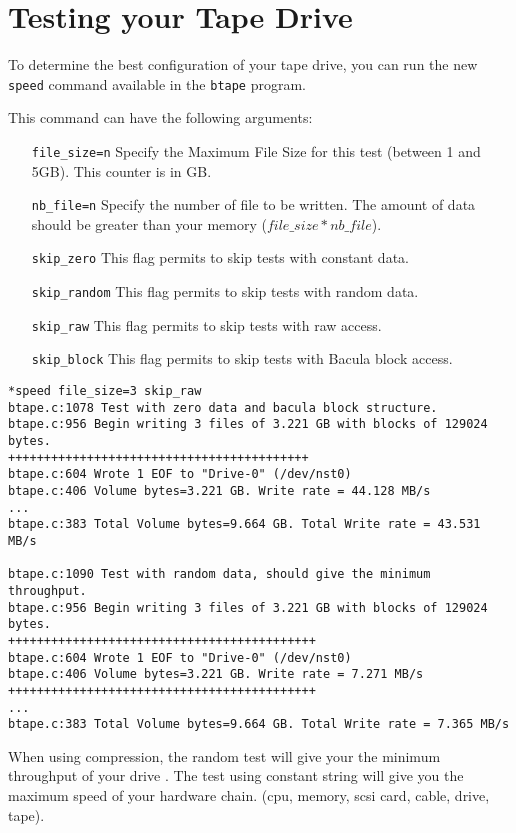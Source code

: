 \section{Testing your Tape Drive}
\label{sec:btapespeed}

To determine the best configuration of your tape drive, you can run the new
\texttt{speed} command available in the \texttt{btape} program.

This command can have the following arguments:
\begin{itemize}
\item[\texttt{file\_size=n}] Specify the Maximum File Size for this test
  (between 1 and 5GB). This counter is in GB.
\item[\texttt{nb\_file=n}] Specify the number of file to be written. The amount
  of data should be greater than your memory ($file\_size*nb\_file$).
\item[\texttt{skip\_zero}] This flag permits to skip tests with constant
  data.
\item[\texttt{skip\_random}] This flag permits to skip tests with random
  data.
\item[\texttt{skip\_raw}] This flag permits to skip tests with raw access.
\item[\texttt{skip\_block}] This flag permits to skip tests with Bacula block
  access.
\end{itemize}

\begin{verbatim}
*speed file_size=3 skip_raw
btape.c:1078 Test with zero data and bacula block structure.
btape.c:956 Begin writing 3 files of 3.221 GB with blocks of 129024 bytes.
++++++++++++++++++++++++++++++++++++++++++
btape.c:604 Wrote 1 EOF to "Drive-0" (/dev/nst0)
btape.c:406 Volume bytes=3.221 GB. Write rate = 44.128 MB/s
...
btape.c:383 Total Volume bytes=9.664 GB. Total Write rate = 43.531 MB/s

btape.c:1090 Test with random data, should give the minimum throughput.
btape.c:956 Begin writing 3 files of 3.221 GB with blocks of 129024 bytes.
+++++++++++++++++++++++++++++++++++++++++++
btape.c:604 Wrote 1 EOF to "Drive-0" (/dev/nst0)
btape.c:406 Volume bytes=3.221 GB. Write rate = 7.271 MB/s
+++++++++++++++++++++++++++++++++++++++++++
...
btape.c:383 Total Volume bytes=9.664 GB. Total Write rate = 7.365 MB/s

\end{verbatim}

When using compression, the random test will give your the minimum throughput
of your drive . The test using constant string will give you the maximum speed
of your hardware chain. (cpu, memory, scsi card, cable, drive, tape).

